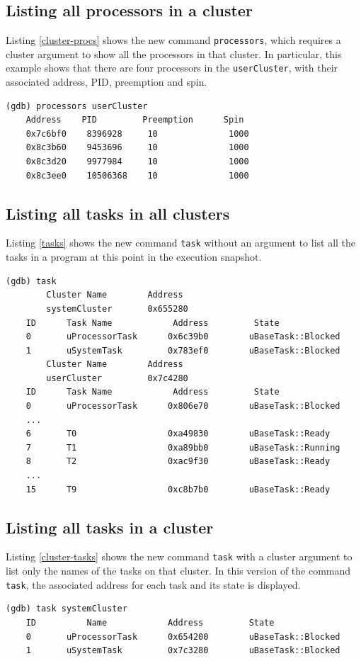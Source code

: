 \subsection{Listing all processors in a cluster}
Listing \ref{cluster-procs} shows the new command \verb|processors|, which
requires a cluster argument to show all the processors in that cluster. In
particular, this example shows that there are four processors in the
\verb|userCluster|, with their associated address, PID, preemption and spin.
\begin{lstlisting}[caption={processors command}, label={cluster-procs}, basicstyle=\small\tt]
(gdb) processors userCluster
    Address    PID         Preemption      Spin
    0x7c6bf0    8396928     10              1000
    0x8c3b60    9453696     10              1000
    0x8c3d20    9977984     10              1000
    0x8c3ee0    10506368    10              1000
\end{lstlisting}

\subsection{Listing all tasks in all clusters}
Listing \ref{tasks} shows the new command \verb|task| without an argument to
list all the tasks in a \uCPPS program at this point in the execution snapshot.
\begin{lstlisting}[caption={task command for displaying all tasks for all
clusters}, label={tasks}, basicstyle=\small\tt]
(gdb) task
        Cluster Name        Address
        systemCluster       0x655280
    ID      Task Name            Address         State
    0       uProcessorTask      0x6c39b0        uBaseTask::Blocked
    1       uSystemTask         0x783ef0        uBaseTask::Blocked
        Cluster Name        Address
        userCluster         0x7c4280
    ID      Task Name            Address         State
    0       uProcessorTask      0x806e70        uBaseTask::Blocked
    ...
    6       T0                  0xa49830        uBaseTask::Ready
    7       T1                  0xa89bb0        uBaseTask::Running
    8       T2                  0xac9f30        uBaseTask::Ready
    ...
    15      T9                  0xc8b7b0        uBaseTask::Ready
\end{lstlisting}

\subsection{Listing all tasks in a cluster}
Listing \ref{cluster-tasks} shows the new command \verb|task| with a cluster
argument to list only the names of the tasks on that cluster.  In this version
of the command \verb|task|, the associated address for each task and its state
is displayed.
\begin{lstlisting}[caption={task command for displaying all tasks in a cluster}, label={cluster-tasks}, basicstyle=\small\tt]
(gdb) task systemCluster
    ID          Name            Address         State
    0       uProcessorTask      0x654200        uBaseTask::Blocked
    1       uSystemTask         0x7c3280        uBaseTask::Blocked
\end{lstlisting}

